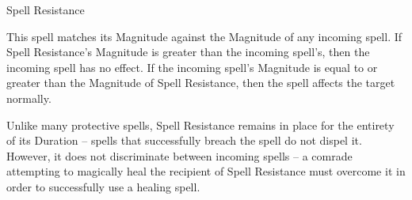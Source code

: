 \begin{rpg-spell}
{Spell Resistance}
{}

This spell matches its Magnitude against the Magnitude of any incoming spell. If Spell Resistance’s Magnitude is greater than the incoming spell’s, then the incoming spell has no effect. If the incoming spell’s Magnitude is equal to or greater than the Magnitude of Spell Resistance, then the spell affects the target normally. 

Unlike many protective spells, Spell Resistance remains in place for the entirety of its Duration – spells that successfully breach the spell do not dispel it. However, it does not discriminate between incoming spells – a comrade attempting to magically heal the recipient of Spell Resistance must overcome it in order to successfully use a healing spell. 
\end{rpg-spell}


%
%
%
%


